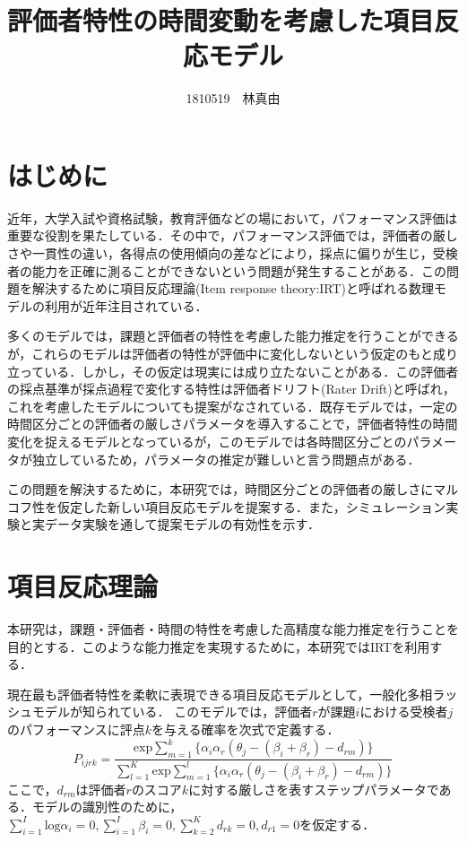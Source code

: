 \documentclass[dvipdfmx, twocolumn, a4paper]{hcresume}
\title{\bf 評価者特性の時間変動を考慮した項目反応モデル}
\author{1810519　林真由}
\begin{document}
\maketitle
\pagestyle{empty}
\thispagestyle{empty}
\section{はじめに}
近年，大学入試や資格試験，教育評価などの場において，パフォーマンス評価は重要な役割を果たしている．その中で，パフォーマンス評価では，評価者の厳しさや一貫性の違い，各得点の使用傾向の差などにより，採点に偏りが生じ，受検者の能力を正確に測ることができないという問題が発生することがある．この問題を解決するために項目反応理論(Item response theory:IRT)\cite{IRTLord}と呼ばれる数理モデルの利用が近年注目されている．

多くのモデルでは，課題と評価者の特性を考慮した能力推定を行うことができるが，これらのモデルは評価者の特性が評価中に変化しないという仮定のもと成り立っている．しかし，その仮定は現実には成り立たないことがある．この評価者の採点基準が採点過程で変化する特性は評価者ドリフト(Rater Drift)と呼ばれ，これを考慮したモデルについても提案がなされている．既存モデルでは，一定の時間区分ごとの評価者の厳しさパラメータを導入することで，評価者特性の時間変化を捉えるモデルとなっているが，このモデルでは各時間区分ごとのパラメータが独立しているため，パラメータの推定が難しいと言う問題点がある．

この問題を解決するために，本研究では，時間区分ごとの評価者の厳しさにマルコフ性を仮定した新しい項目反応モデルを提案する．また，シミュレーション実験と実データ実験を通して提案モデルの有効性を示す．

\section{項目反応理論}
本研究は，課題・評価者・時間の特性を考慮した高精度な能力推定を行うことを目的とする．このような能力推定を実現するために，本研究ではIRTを利用する．

現在最も評価者特性を柔軟に表現できる項目反応モデルとして，一般化多相ラッシュモデルが知られている\cite{g-MFRM}．
このモデルでは，評価者$r$が課題$i$における受検者$j$のパフォーマンスに評点$k$を与える確率を次式で定義する．
\begin{displaymath}
  P_{ijrk}=\frac{\mathrm{exp}\sum_{m=1}^{k}\{\alpha_i\alpha_r(\theta_{j}-(\beta_{i}+\beta_{r})-d_{rm})\}}{\sum_{l=1}^{K}\mathrm{exp}\sum_{m=1}^{l}\{\alpha_i\alpha_r(\theta_{j}-(\beta_{i}+\beta_{r})-d_{rm})\}}
\end{displaymath}
ここで，$d_{rm}$は評価者$r$のスコア$k$に対する厳しさを表すステップパラメータである．モデルの識別性のために，$\sum^{I}_{i=1}{\mathrm{log}\alpha_i}=0,\sum^{I}_{i=1}{\beta_i}=0,\sum^{K}_{k=2}{d_{rk}}=0, d_{r1}=0$を仮定する．
\end{document}
